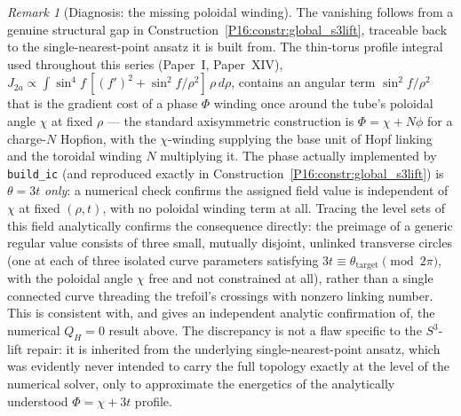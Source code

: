 \documentclass[11pt,a4paper]{article}
\theoremstyle{definition}\newtheorem{definition}[theorem]{Definition}
\theoremstyle{remark}
\newtheorem{remark}[theorem]{Remark}
\theoremstyle{definition}\newtheorem{construction}[theorem]{Construction}
\newcommand{\QH}{Q_H}
\begin{document}
\begin{remark}[Diagnosis: the missing poloidal winding]
\label{P16:rem:missing_poloidal_winding}
The vanishing follows from a genuine structural gap in
Construction~\ref{P16:constr:global_s3lift}, traceable back to the
single-nearest-point ansatz it is built from. The thin-torus profile
integral used throughout this series (Paper~I, Paper~XIV),
$J_{2a}\propto\int\sin^4\!f\,[(f')^2+\sin^2\!f/\rho^2]\,\rho\,d\rho$,
contains an angular term $\sin^2\!f/\rho^2$ that is the gradient cost
of a phase $\Phi$ winding once around the tube's poloidal angle
$\chi$ at fixed $\rho$ --- the standard axisymmetric construction is
$\Phi=\chi+N\phi$ for a charge-$N$ Hopfion, with the $\chi$-winding
supplying the base unit of Hopf linking and the toroidal winding $N$
multiplying it. The phase actually implemented by \texttt{build\_ic}
(and reproduced exactly in
Construction~\ref{P16:constr:global_s3lift})
is $\theta=3t$ \emph{only}: a numerical check confirms the assigned
field value is independent of $\chi$ at fixed $(\rho,t)$, with no
poloidal winding term at all. Tracing the level sets of this field
analytically confirms the consequence directly: the preimage of a
generic regular value consists of three small, mutually disjoint,
unlinked transverse circles (one at each of three isolated curve
parameters satisfying $3t\equiv\theta_{\mathrm{target}}\pmod{2\pi}$,
with the poloidal angle $\chi$ free and not constrained at all),
rather than a single connected curve threading the trefoil's
crossings with nonzero linking number. This is consistent with, and
gives an independent analytic confirmation of, the numerical
$\QH=0$ result above. The discrepancy is not a flaw specific to the
$S^3$-lift repair: it is inherited from the underlying
single-nearest-point ansatz, which was evidently never intended to
carry the full topology exactly at the level of the numerical
solver, only to approximate the energetics of the analytically
understood $\Phi=\chi+3t$ profile.
\end{remark}
\end{document}

